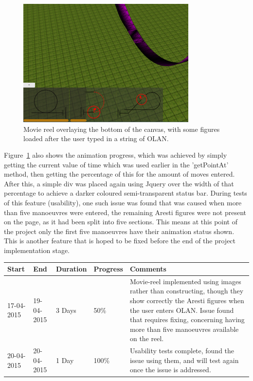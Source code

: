 \begin{figure}[h]
  \centering
      \includegraphics[width=0.8\textwidth]{images/movie.png}
  \caption{Movie reel overlaying the bottom of the canvas, with some figures loaded after the user typed in a string of OLAN.}
  \label{fig:movie}
\end{figure}

Figure~\ref{fig:movie} also shows the animation progress, which was achieved by simply getting the current value of time which was used earlier in the 'getPointAt' method, then getting the percentage of this for the amount of moves entered. After this, a simple div was placed again using Jquery over the width of that percentage to achieve a darker coloured semi-transparent status bar. During tests of this feature (usability), one such issue was found that was caused when more than five manoeuvres were entered, the remaining Aresti figures were not present on the page, as it had been split into five sections. This means at this point of the project only the first five manoeuvres have their animation status shown. This is another feature that is hoped to be fixed before the end of the project implementation stage. 

\begin{table}[h]
\begin{tabular}{|l|l|l|l|p{7cm}|}
\hline
\textbf{Start} & \textbf{End} & \textbf{Duration} & \textbf{Progress} & \textbf{Comments}                                                                                                     \\ \hline
17-04-2015     & 19-04-2015   & 3 Days            & 50\%             &  Movie-reel implemented using images rather than constructing, though they show correctly the Aresti figures when the user enters OLAN. Issue found that requires fixing, concerning having more than five manoeuvres available on the reel.\\ \hline
20-04-2015     & 20-04-2015   & 1 Day            & 100\%             &  Usability tests complete, found the issue using them, and will test again once the issue is addressed.\\ \hline
\end{tabular}
\end{table}

